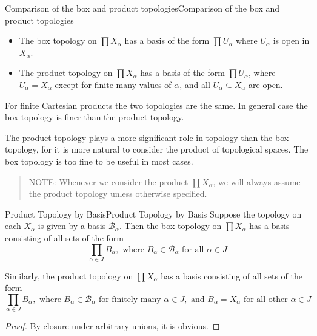 \documentclass[../main.tex]{subfiles}
\begin{document}
\begin{theorem}{Comparison of the box and product topologies}{Comparison of the box and product topologies}
\begin{itemize}
\item The box topology on $\prod X_{\alpha}$ has a basis of the form $\prod U_{\alpha}$ where $U_{\alpha}$ is open in $X_{\alpha}$.
\item The product topology on $\prod X_{\alpha}$ has a basis of the form $\prod U_{\alpha}$, where $U_{\alpha} = X_{\alpha}$ except for finite many values of $\alpha$, and all $U_{\alpha} \subseteq X_{\alpha}$ are open.
\end{itemize}

For finite Cartesian products the two topologies are the same. In general case the box topology is finer than the product topology.
\end{theorem}

The product topology plays a more significant role in topology than the box topology, for it is more natural to consider the product of topological spaces. The box topology is too fine to be useful in most cases.

\begin{quote}
NOTE: Whenever we consider the product $\prod X_{\alpha}$, we will always assume the product topology unless otherwise specified.
\end{quote}

\begin{theorem}{Product Topology by Basis}{Product Topology by Basis}
Suppose the topology on each $X_{\alpha}$ is given by a basis $\mathcal{B}_{\alpha}$. Then the box topology on $\prod X_{\alpha}$ has a basis consisting of all sets of the form
\begin{equation*}
	\prod_{\alpha\in J} B_{\alpha}, \text{ where } B_{\alpha}\in \mathcal{B}_{\alpha} \text{ for all } \alpha\in J
\end{equation*}

Similarly, the product topology on $\prod X_{\alpha}$ has a basis consisting of all sets of the form
\begin{equation*}
	\prod_{\alpha\in J} B_{\alpha}, \text{ where } B_{\alpha}\in \mathcal{B}_{\alpha} \text{ for finitely many } \alpha\in J, \text{ and } B_{\alpha} = X_{\alpha} \text{ for all other } \alpha\in J
\end{equation*}
\end{theorem}
\begin{proof}
By closure under arbitrary unions, it is obvious.
\end{proof}
\end{document}
